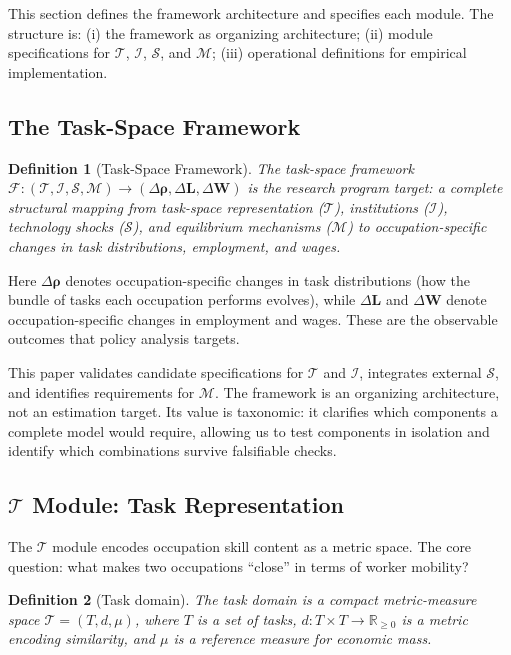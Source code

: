 \documentclass[12pt]{article}
\newtheorem{definition}{Definition}[section]
\begin{document}
This section defines the framework architecture and specifies each module. The structure is: (i) the framework as organizing architecture; (ii) module specifications for $\mathcal{T}$, $\mathcal{I}$, $\mathcal{S}$, and $\mathcal{M}$; (iii) operational definitions for empirical implementation.


\subsection{The Task-Space Framework}
\label{subsec:framework}


\begin{definition}[Task-Space Framework]
\label{def:framework}
The \emph{task-space framework} $\mathcal{F}: (\mathcal{T}, \mathcal{I}, \mathcal{S}, \mathcal{M}) \to (\Delta\boldsymbol{\rho}, \Delta \mathbf{L}, \Delta \mathbf{W})$ is the research program target: a complete structural mapping from task-space representation ($\mathcal{T}$), institutions ($\mathcal{I}$), technology shocks ($\mathcal{S}$), and equilibrium mechanisms ($\mathcal{M}$) to occupation-specific changes in task distributions, employment, and wages.
\end{definition}

Here $\Delta\boldsymbol{\rho}$ denotes occupation-specific changes in task distributions (how the bundle of tasks each occupation performs evolves), while $\Delta \mathbf{L}$ and $\Delta \mathbf{W}$ denote occupation-specific changes in employment and wages. These are the observable outcomes that policy analysis targets.

This paper validates candidate specifications for $\mathcal{T}$ and $\mathcal{I}$, integrates external $\mathcal{S}$, and identifies requirements for $\mathcal{M}$. The framework is an organizing architecture, not an estimation target. Its value is taxonomic: it clarifies which components a complete model would require, allowing us to test components in isolation and identify which combinations survive falsifiable checks.


\subsection{$\mathcal{T}$ Module: Task Representation}
\label{subsec:t-module}


The $\mathcal{T}$ module encodes occupation skill content as a metric space. The core question: what makes two occupations ``close'' in terms of worker mobility?


\begin{definition}[Task domain]
\label{def:task-domain}
The \emph{task domain} is a compact metric-measure space $\mathcal{T} = (T, d, \mu)$, where $T$ is a set of tasks, $d: T \times T \to \mathbb{R}_{\geq 0}$ is a metric encoding similarity, and $\mu$ is a reference measure for economic mass.
\end{definition}
\end{document}
